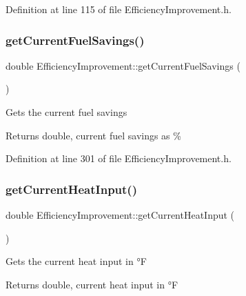 Definition at line 115 of file Efficiency\+Improvement.\+h.

\mbox{\label{class_efficiency_improvement_ab2e940be7192df960c9eb9578096796f}} 
\subsubsection{\texorpdfstring{get\+Current\+Fuel\+Savings()}{getCurrentFuelSavings()}}
{\footnotesize\ttfamily double Efficiency\+Improvement\+::get\+Current\+Fuel\+Savings (\begin{DoxyParamCaption}{ }\end{DoxyParamCaption})\hspace{0.3cm}{\ttfamily [inline]}}

Gets the current fuel savings

\begin{DoxyReturn}{Returns}
double, current fuel savings as \% 
\end{DoxyReturn}


Definition at line 301 of file Efficiency\+Improvement.\+h.

\mbox{\label{class_efficiency_improvement_af43c4706cb5cd67ce58e9c4356e4564c}} 
\subsubsection{\texorpdfstring{get\+Current\+Heat\+Input()}{getCurrentHeatInput()}}
{\footnotesize\ttfamily double Efficiency\+Improvement\+::get\+Current\+Heat\+Input (\begin{DoxyParamCaption}{ }\end{DoxyParamCaption})}

Gets the current heat input in °F

\begin{DoxyReturn}{Returns}
double, current heat input in °F 
\end{DoxyReturn}


